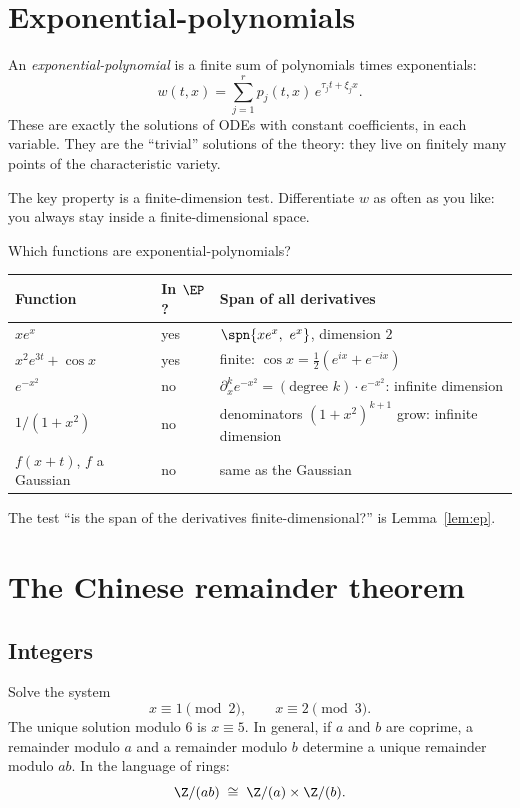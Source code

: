 \section{Exponential-polynomials}\label{sec:pr-ep}

An \emph{exponential-polynomial} is a finite sum of polynomials times exponentials:
\[
w(t,x)=\sum_{j=1}^{r}p_j(t,x)\,e^{\tau_jt+\xi_jx}.
\]
These are exactly the solutions of ODEs with constant coefficients, in each variable. They are the ``trivial'' solutions of the theory: they live on finitely many points of the characteristic variety.

The key property is a finite-dimension test. Differentiate $w$ as often as you like: you always stay inside a finite-dimensional space.

\begin{example}{Which functions are exponential-polynomials?}
\begin{center}\small
\begin{tabular}{@{}L{4.4cm}L{1.6cm}L{8.0cm}@{}}
\toprule
Function & In $\EP$? & Span of all derivatives\\\midrule
$xe^{x}$ & yes & $\spn\{xe^x,\ e^x\}$, dimension $2$\\
$x^2e^{3t}+\cos x$ & yes & finite: $\cos x=\tfrac12(e^{ix}+e^{-ix})$\\
$e^{-x^2}$ & no & $\partial_x^ke^{-x^2}=(\text{degree }k)\cdot e^{-x^2}$: infinite dimension\\
$1/(1+x^2)$ & no & denominators $(1+x^2)^{k+1}$ grow: infinite dimension\\
$f(x+t)$, $f$ a Gaussian & no & same as the Gaussian\\
\bottomrule
\end{tabular}
\end{center}
The test ``is the span of the derivatives finite-dimensional?'' is Lemma~\ref{lem:ep}.
\end{example}

\section{The Chinese remainder theorem}\label{sec:pr-crt}

\subsection{Integers}

Solve the system
\[
x\equiv1\pmod 2,\qquad x\equiv2\pmod 3 .
\]
The unique solution modulo $6$ is $x\equiv5$. In general, if $a$ and $b$ are coprime, a remainder modulo $a$ and a remainder modulo $b$ determine a unique remainder modulo $ab$. In the language of rings:
\[
\Z/(ab)\;\cong\;\Z/(a)\times\Z/(b).
\]

